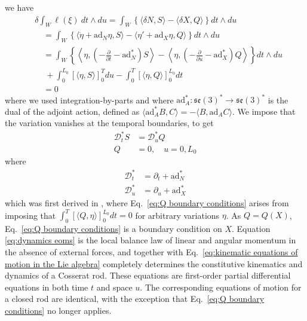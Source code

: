 we have
\begin{equation} \label{eq:variation of ell derivation}
\begin{aligned}
& \delta \int_W \ell(\xi)\ dt \wedge du  = \int_W \left\{ \langle  \delta N,  S \rangle  - \langle \delta X, Q \rangle  \right\} dt \wedge du  \\
& \quad = \int_W \left\{   \langle \dot{\eta} + \text{ad}_N \eta, S \rangle  - \langle  \eta' + \text{ad}_X \eta, Q \rangle  \right\}  dt \wedge du \\
& \quad = \int_W \left\{ \left\langle \eta, \left( - \frac{\partial}{\partial t} - \text{ad}_N^* \right) S \right\rangle  - \left\langle  \eta, \left( - \frac{\partial}{\partial u} - \text{ad}_X^* \right) Q \right\rangle  \right\}  dt \wedge du \\
& \quad \ + \int_0^{L_0} \left[ \langle \eta, S \rangle \right]_0^T du - \int_0^T \left[ \langle \eta, Q \rangle \right]_0^{L_0} dt \\
& \quad = 0
\end{aligned}
\end{equation}
where we used integration-by-parts and where $\text{ad}_A^* : \mathfrak{se}(3)^* \to \mathfrak{se}(3)^*$ is the dual of the adjoint action, defined as $\langle \text{ad}_A^* B , C \rangle = -\langle B, \text{ad}_A C \rangle$. We impose that the variation vanishes at the temporal boundaries, to get
\begin{subequations} \label{eq:dynamics eoms}
\begin{align}
\mathcal{D}^*_t S & = \mathcal{D}^*_u Q \\
Q & = 0, \quad u = 0, L_0 \label{eq:Q boundary conditions}
\end{align}
\end{subequations}
where
\begin{subequations}
\begin{align}
\mathcal{D}^*_t & = \partial_t + \text{ad}_N^*  \\
\mathcal{D}^*_u & = \partial_u + \text{ad}_X^* 
\end{align}
\end{subequations}
which was first derived in \citep{holmMatrixGstrands2014, giusteriSimulationViscoelasticCosserat2021}, where Eq.~\ref{eq:Q boundary conditions} arises from imposing that $\int_0^T \left[ \langle Q, \eta \rangle \right]_0^{L_0} dt = 0$ for arbitrary variations $\eta$.  As $Q = Q(X)$, Eq.~\ref{eq:Q boundary conditions} is a boundary condition on $X$. Equation \ref{eq:dynamics eoms} is the local balance law of linear and angular momentum in the absence of external forces, and together with Eq.~\ref{eq:kinematic equations of motion in the Lie algebra} completely determines the constitutive kinematics and dynamics of a Cosserat rod. These equations are first-order partial differential equations in both time $t$ and space $u$. The corresponding equations of motion for a closed rod are identical, with the exception that Eq.~\ref{eq:Q boundary conditions} no longer applies.

